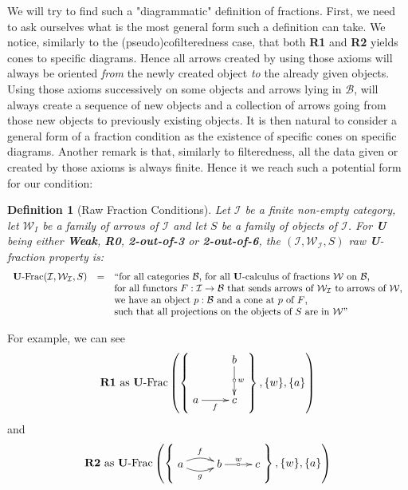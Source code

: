 \documentclass{article}
\numberwithin{equation}{section}
\theoremstyle{definition}
\theoremstyle{plain}
\newtheorem{definition}[equation]{Definition}
\begin{document}
We will try to find such a "diagrammatic" definition of fractions. First, we need to ask ourselves what is the most general form such a definition can take. We notice, similarly to the (pseudo)cofilteredness case, that both \textbf{R1} and \textbf{R2} yields cones to specific diagrams. Hence all arrows created by using those axioms will always be oriented \textit{from} the newly created object \textit{to} the already given objects. Using those axioms successively on some objects and arrows lying in $\mathcal{B}$, will always create a sequence of new objects and a collection of arrows going from those new objects to previously existing objects. It is then natural to consider a general form of a fraction condition as the existence of specific cones on specific diagrams. Another remark is that, similarly to filteredness, all the data given or created by those axioms is always finite. Hence it we reach such a potential form for our condition:

\begin{definition}[Raw Fraction Conditions] Let $\mathcal{I}$ be a finite non-empty category, let $\mathcal{W}_I$ be a family of arrows of $\mathcal{I}$ and let $S$ be a family of objects of $\mathcal{I}$. For \textbf{U} being either \textbf{Weak}, \textbf{R0}, \textbf{2-out-of-3} or \textbf{2-out-of-6}, the $(\mathcal{I}, \mathcal{W}_{\mathcal{I}}, S)$ raw \textbf{U}-fraction property is: 
	\[\begin{array}{rcl}
		\textnormal{\textbf{U}-Frac}(\mathcal{I}, \mathcal{W}_{\mathcal{I}}, S) & = & \text{``for all categories $\mathcal{B}$, for all \textbf{U}-calculus of fractions $\mathcal{W}$ on $\mathcal{B}$,}  \\
		&& \text{for all functors $F: \mathcal{I} \to \mathcal{B}$ that sends arrows of $\mathcal{W}_{\mathcal{I}}$ to arrows of $\mathcal{W}$,}\\
		&& \text{we have an object $p:\mathcal{B}$ and a cone at $p$ of $F$,}\\
		&& \text{such that all projections on the objects of $S$ are in $\mathcal{W}$''}
	\end{array}\]
\end{definition}

For example, we can see \[\textbf{R1} \textnormal{ as \textbf{U}-Frac}\left(\left\{\vcenter{\xymatrix{& b\ar[d]^w|{\circ}\\a \ar[r]_f & c}}\right\}, \{w\}, \{a\}\right)\] and \[\textbf{R2} \textnormal{ as \textbf{U}-Frac}\left(\left\{\vcenter{\xymatrix{a \ar@/^/[r]^f \ar@/_/[r]_g & b \ar[r]^w|{\circ} & c}}\right\}, \{w\}, \{a\}\right)\]
\end{document}
